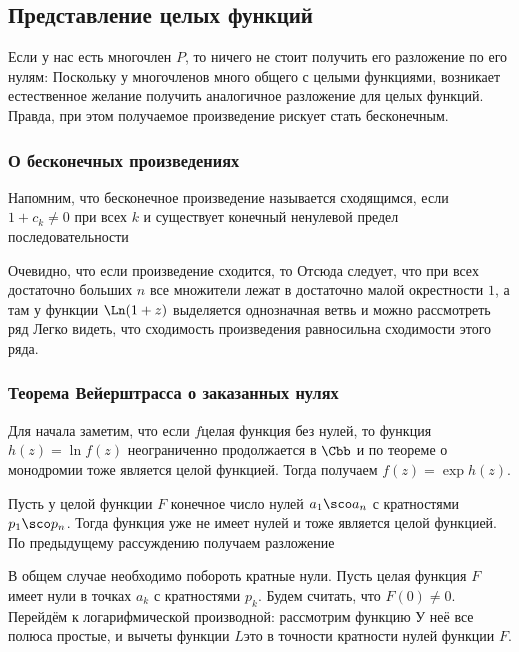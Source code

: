 \documentclass[a4paper]{article}
\begin{document}
\subsection{Представление целых функций}

Если у нас есть многочлен $P$, то ничего не стоит получить его разложение по его нулям:
Поскольку у многочленов много общего с целыми функциями, возникает естественное желание
получить аналогичное разложение
для целых функций. Правда, при этом получаемое произведение рискует стать бесконечным.

\subsubsection{О бесконечных произведениях}

Напомним, что бесконечное произведение
называется сходящимся, если $1 + c_k \neq 0$ при всех $k$ и существует конечный ненулевой предел
последовательности

Очевидно, что если произведение сходится, то
Отсюда следует, что при всех  достаточно больших $n$ все множители лежат в достаточно малой
окрестности $1$, а там у функции $\Ln(1+z)$ выделяется однозначная ветвь и можно рассмотреть
ряд
Легко видеть, что сходимость произведения равносильна сходимости этого ряда.

\subsubsection{Теорема Вейерштрасса о заказанных нулях}

Для начала заметим, что если $f$\т целая функция без нулей, то функция $h(z) = \ln f(z)$ неограниченно
продолжается в $\Cbb$ и по теореме о монодромии тоже является целой функцией. Тогда
получаем $f(z) = \exp h(z)$.

Пусть у целой функции $F$ конечное число нулей $a_1\sco a_n$ с кратностями $p_1\sco p_n$. Тогда функция
уже не имеет нулей и тоже является целой функцией. По предыдущему рассуждению получаем разложение

В общем случае необходимо побороть кратные нули. Пусть целая функция $F$ имеет нули
в точках $a_k$ с кратностями $p_k$. Будем считать, что $F(0) \neq 0$.
Перейдём к логарифмической производной: рассмотрим функцию
У неё все полюса простые, и вычеты функции $L$\т это в точности кратности нулей функции $F$.
\end{document}
